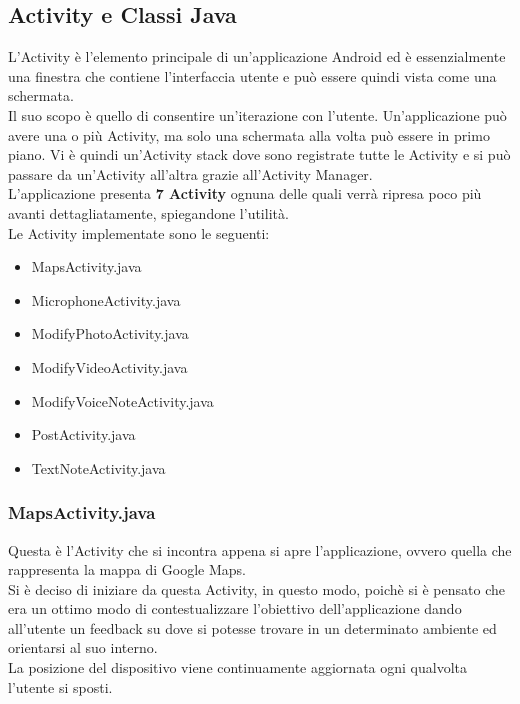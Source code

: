 \subsection{Activity e Classi Java}
\label{activity}
L’Activity è l’elemento principale di un’applicazione Android ed è essenzialmente una finestra che contiene l’interfaccia utente e può essere quindi vista come una schermata.\\
Il suo scopo è quello di consentire un’iterazione con l’utente. Un’applicazione può avere una o più Activity, ma solo una schermata alla volta può essere in primo piano. Vi è quindi un’Activity stack dove sono registrate tutte le Activity e si può passare da un’Activity all’altra grazie all’Activity Manager.\\
L'applicazione presenta \textbf{7 Activity} ognuna delle quali verrà ripresa poco più avanti dettagliatamente, spiegandone l'utilità.\\
Le Activity implementate sono le seguenti:
\begin{itemize}
\item MapsActivity.java
\item MicrophoneActivity.java
\item ModifyPhotoActivity.java
\item ModifyVideoActivity.java
\item ModifyVoiceNoteActivity.java
\item PostActivity.java
\item TextNoteActivity.java
\end{itemize}

\subsubsection{MapsActivity.java}
Questa è l'Activity che si incontra appena si apre l'applicazione, ovvero quella che rappresenta la mappa di Google Maps.
\\Si è deciso di iniziare da questa Activity, in questo modo, poichè si è pensato che era un ottimo modo di contestualizzare l'obiettivo dell'applicazione dando all'utente un feedback su dove si potesse trovare in un determinato ambiente ed orientarsi al suo interno.
\\La posizione del dispositivo viene continuamente aggiornata ogni qualvolta l'utente si sposti.


